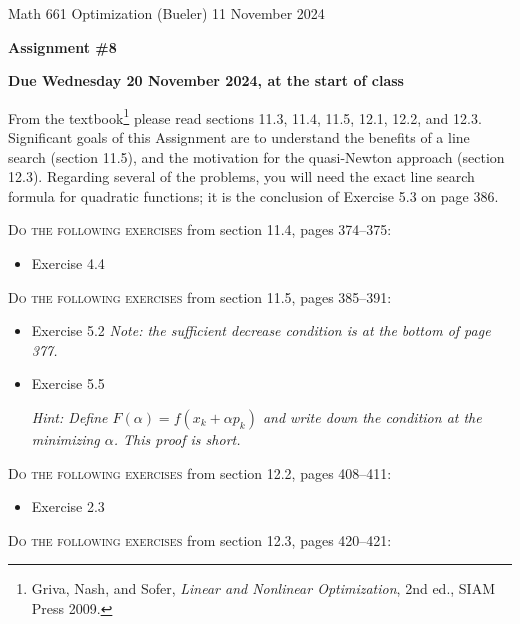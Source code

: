\documentclass[12pt]{amsart}
\begin{document}
\scriptsize \noindent Math 661 Optimization (Bueler) \hfill 11 November 2024
\normalsize

\medskip\bigskip

\Large\centerline{\textbf{Assignment \#8}}
\large
\bigskip

\centerline{\textbf{Due Wednesday 20 November 2024, at the start of class}}
\bigskip
\normalsize

\thispagestyle{empty}

\bigskip
\noindent From the textbook\footnote{Griva, Nash, and Sofer, \emph{Linear and Nonlinear Optimization}, 2nd ed., SIAM Press 2009.} please read sections 11.3, 11.4, 11.5, 12.1, 12.2, and 12.3.  Significant goals of this Assignment are to understand the benefits of a line search (section 11.5), and the motivation for the quasi-Newton approach (section 12.3).  Regarding several of the problems, you will need the exact line search formula for quadratic functions; it is the conclusion of Exercise 5.3 on page 386.

\bigskip
\noindent \textsc{Do the following exercises} from section 11.4, pages 374--375:

\begin{itemize}
\item Exercise 4.4
\end{itemize}

\bigskip
\noindent \textsc{Do the following exercises} from section 11.5, pages 385--391:

\begin{itemize}
\item Exercise 5.2 \quad \emph{Note: the sufficient decrease condition is at the bottom of page 377.}
\item Exercise 5.5 \quad \begin{minipage}[t]{115mm}  \emph{Hint: Define $F(\alpha)=f(x_k+\alpha p_k)$ and write down the condition at the minimizing $\alpha$.  This proof is short.}
\end{minipage}
\end{itemize}


\bigskip
\noindent \textsc{Do the following exercises} from section 12.2, pages 408--411:

\begin{itemize}
\item Exercise 2.3
\end{itemize}


\bigskip
\noindent \textsc{Do the following exercises} from section 12.3, pages 420--421:
\end{document}
